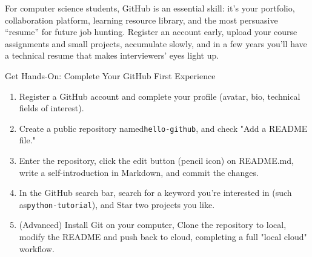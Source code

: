 For computer science students, GitHub is an essential skill: it's your portfolio, collaboration platform, learning resource library, and the most persuasive “resume” for future job hunting. Register an account early, upload your course assignments and small projects, accumulate slowly, and in a few years you'll have a technical resume that makes interviewers' eyes light up.

\begin{tcbpractice}{Get Hands-On: Complete Your GitHub First Experience}
\begin{enumerate}
  \item Register a GitHub account and complete your profile (avatar, bio, technical fields of interest).
  \item Create a public repository named\texttt{hello-\allowbreak github}, and check "Add a README file."
  \item Enter the repository, click the edit button (pencil icon) on README.md, write a self-introduction in Markdown, and commit the changes.
  \item In the GitHub search bar, search for a keyword you're interested in (such as\texttt{python-\allowbreak tutorial}), and Star two projects you like.
  \item (Advanced) Install Git on your computer, Clone the repository to local, modify the README and push back to cloud, completing a full "local cloud" workflow.
\end{enumerate}

\end{tcbpractice}
